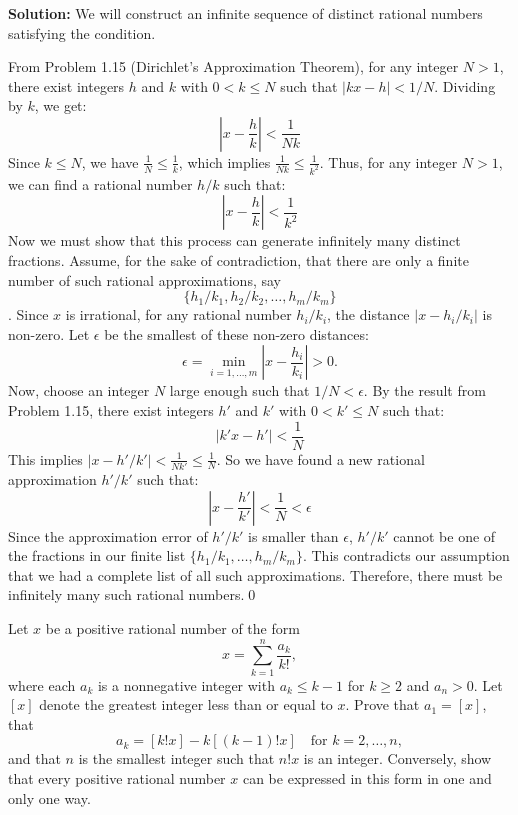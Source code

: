 \bigskip\noindent\textbf{Solution:}
We will construct an infinite sequence of distinct rational numbers satisfying the condition.

From Problem 1.15 (Dirichlet's Approximation Theorem), for any integer $N > 1$, there exist integers $h$ and $k$ with $0 < k \leq N$ such that $|kx - h| < 1/N$.
Dividing by $k$, we get:
\[
\left|x - \frac{h}{k}\right| < \frac{1}{Nk}
\]
Since $k \leq N$, we have $\frac{1}{N} \leq \frac{1}{k}$, which implies $\frac{1}{Nk} \leq \frac{1}{k^2}$.
Thus, for any integer $N>1$, we can find a rational number $h/k$ such that:
\[
\left|x - \frac{h}{k}\right| < \frac{1}{k^2}
\]
Now we must show that this process can generate infinitely many distinct fractions.
Assume, for the sake of contradiction, that there are only a finite number of such rational approximations, say $$\{h_1/k_1, h_2/k_2, \ldots, h_m/k_m\}$$.
Since $x$ is irrational, for any rational number $h_i/k_i$, the distance $|x - h_i/k_i|$ is non-zero. Let $\epsilon$ be the smallest of these non-zero distances:
\[
\epsilon = \min_{i=1,\dots,m} \left|x - \frac{h_i}{k_i}\right| > 0.
\]
Now, choose an integer $N$ large enough such that $1/N < \epsilon$.
By the result from Problem 1.15, there exist integers $h'$ and $k'$ with $0 < k' \leq N$ such that:
\[
|k'x - h'| < \frac{1}{N}
\]
This implies $|x - h'/k'| < \frac{1}{Nk'} \leq \frac{1}{N}$.
So we have found a new rational approximation $h'/k'$ such that:
\[
\left|x - \frac{h'}{k'}\right| < \frac{1}{N} < \epsilon
\]
Since the approximation error of $h'/k'$ is smaller than $\epsilon$, $h'/k'$ cannot be one of the fractions in our finite list $\{h_1/k_1, \ldots, h_m/k_m\}$. This contradicts our assumption that we had a complete list of all such approximations.
Therefore, there must be infinitely many such rational numbers.\qed


\begin{problembox}
\begin{problemstatement}
Let $x$ be a positive rational number of the form
\[
x = \sum_{k=1}^n \frac{a_k}{k!},
\]
where each $a_k$ is a nonnegative integer with $a_k \leq k - 1$ for $k \geq 2$ and $a_n > 0$. Let $[x]$ denote the greatest integer less than or equal to $x$. Prove that $a_1 = [x]$, that
\[
a_k = [k!x] - k[(k - 1)!x] \quad \text{for } k = 2, \dots, n,
\]
and that $n$ is the smallest integer such that $n!x$ is an integer. Conversely, show that every positive rational number $x$ can be expressed in this form in one and only one way.
\end{problemstatement}
\end{problembox}

